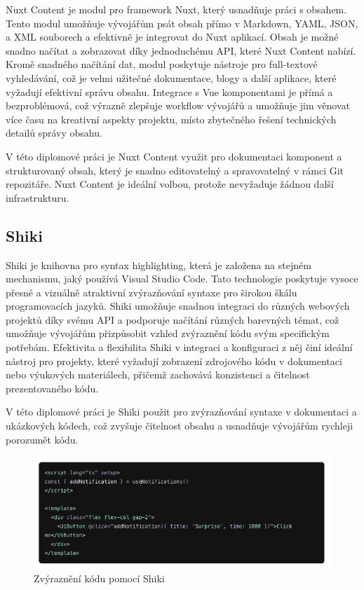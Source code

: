 Nuxt Content je modul pro framework Nuxt, který usnadňuje práci s obsahem. Tento modul umožňuje vývojářům psát obsah přímo v Markdown, YAML, JSON, a XML souborech a efektivně je integrovat do Nuxt aplikací. Obsah je možné snadno načítat a zobrazovat díky jednoduchému API, které Nuxt Content nabízí. Kromě snadného načítání dat, modul poskytuje nástroje pro full-textové vyhledávání, což je velmi užitečné dokumentace, blogy a další aplikace, které vyžadují efektivní správu obsahu. Integrace s Vue komponentami je přímá a bezproblémová, což výrazně zlepšuje workflow vývojářů a umožňuje jim věnovat více času na kreativní aspekty projektu, místo zbytečného řešení technických detailů správy obsahu.

V této diplomové práci je Nuxt Content využit pro dokumentaci komponent a strukturovaný obsah, který je snadno editovatelný a spravovatelný v rámci Git repozitáře. Nuxt Content je ideální volbou, protože nevyžaduje žádnou další infrastrukturu.

\subsection{Shiki}
Shiki je knihovna pro syntax highlighting, která je založena na stejném mechanismu, jaký používá Visual Studio Code. Tato technologie poskytuje vysoce přesné a vizuálně atraktivní zvýrazňování syntaxe pro širokou škálu programovacích jazyků. Shiki umožňuje snadnou integraci do různých webových projektů díky svému API a podporuje načítání různých barevných témat, což umožňuje vývojářům přizpůsobit vzhled zvýraznění kódu svým specifickým potřebám. Efektivita a flexibilita Shiki v integraci a konfiguraci z něj činí ideální nástroj pro projekty, které vyžadují zobrazení zdrojového kódu v dokumentaci nebo výukových materiálech, přičemž zachovává konzistenci a čitelnost prezentovaného kódu. \cite{Shiki}

V této diplomové práci je Shiki použit pro zvýrazňování syntaxe v dokumentaci a ukázkových kódech, což zvyšuje čitelnost obsahu a usnadňuje vývojářům rychleji porozumět kódu.

\begin{figure}[H]
  \includegraphics[width=\textwidth]{images/shiki}
  \caption{Zvýraznění kódu pomocí Shiki} \label{picture:shiki}
\end{figure}

